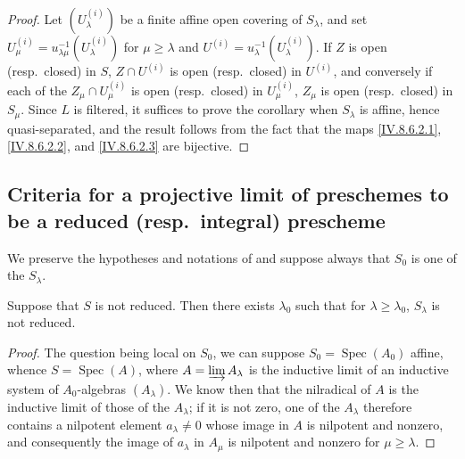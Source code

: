 \begin{proof}
Let $(U_\lambda^{(i)})$ be a finite affine open covering of $S_\lambda$, and set $U^{(i)}_\mu=u_{\lambda\mu}^{-1}(U_\lambda^{(i)})$ for $\mu\geqslant\lambda$ and $U^{(i)}=u_\lambda^{-1}(U_\lambda^{(i)})$.
If $Z$ is open (resp.\ closed) in $S$, $Z\cap U^{(i)}$ is open (resp.\ closed) in $U^{(i)}$, and conversely if each of the $Z_\mu\cap U^{(i)}_\mu$ is open (resp.\ closed) in $U^{(i)}_\mu$, $Z_\mu$ is open (resp.\ closed) in $S_\mu$.
Since $L$ is filtered, it suffices to prove the corollary when $S_\lambda$ is affine, hence quasi-separated, and the result follows from the fact that the maps \eqref{IV.8.6.2.1}, \eqref{IV.8.6.2.2}, and \eqref{IV.8.6.2.3} are bijective.
\end{proof}

\subsection{Criteria for a projective limit of preschemes to be a reduced \textmd{(resp.\ }integral\textmd{)} prescheme}
\label{subsection:IV.8.7}

We preserve the hypotheses and notations of  and suppose always that $S_0$ is one of the $S_\lambda$.

\begin{proposition}[8.7.1]
\label{IV.8.7.1}
Suppose that $S$ is not reduced.
Then there exists $\lambda_0$ such that for $\lambda\geqslant\lambda_0$, $S_\lambda$ is not reduced.
\end{proposition}

\begin{proof}
The question being local on $S_0$, we can suppose $S_0=\operatorname{Spec}(A_0)$ affine, whence $S=\operatorname{Spec}(A)$, where $A=\varinjlim A_\lambda$ is the inductive limit of an inductive system of $A_0$-algebras $(A_\lambda)$.
We know then  that the nilradical of $A$ is the inductive limit of those of the $A_\lambda$; if it is not zero, one of the $A_\lambda$ therefore contains a nilpotent element $a_\lambda\neq 0$ whose image in $A$ is nilpotent and nonzero, and consequently the image of $a_\lambda$ in $A_\mu$ is nilpotent and nonzero for $\mu\geqslant\lambda$.
\end{proof}

